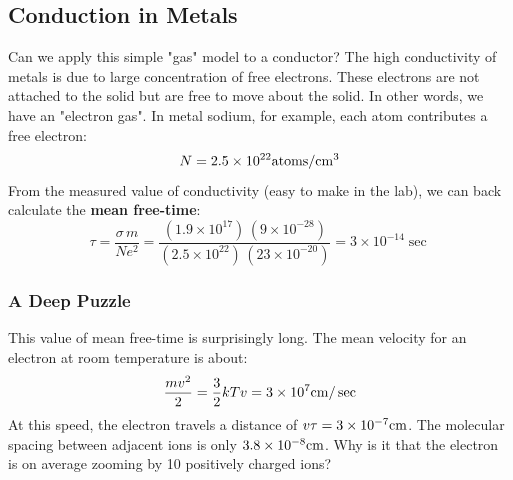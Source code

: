 \subsection{Conduction in Metals}
Can we apply this simple "gas" model to a conductor?  The  high conductivity of metals is due to large concentration of free electrons.   These electrons are not attached to the solid but are free to move about the solid.  In other words, we have an "electron gas".   In metal sodium, for example,  each atom contributes a free electron: 
    \[
        N = 2.5 \times {10^{22}}{\rm{atoms/c}}{{\rm{m}}^{\rm{3}}}
    \]
From the measured value of conductivity (easy to make in the lab), we can back calculate the \textbf{mean free-time}:
    \begin{equation}
        \tau  = \frac{{\sigma \,m}}{{N{e^2}}} = \frac{{\left( {1.9 \times {{10}^{17}}} \right)\,\left( {9 \times {{10}^{ - 28}}} \right)}}{{\left( {2.5 \times {{10}^{22}}} \right)\,\left( {23 \times {{10}^{ - 20}}} \right)}} = 3 \times {10^{ - 14}}\sec
    \end{equation}
\subsubsection{A Deep Puzzle}
This value of mean free-time is surprisingly long.  The mean velocity for an electron at room temperature is about: 
    \begin{equation}
        \frac{{m{v^2}}}{2} = \frac{3}{2}kT  v = 3 \times {10^7}{\rm{cm}}/\sec
    \end{equation}
At this speed, the electron travels a distance of $v\tau  = 3 \times {10^{ - 7}}{\rm{cm}}$.  The molecular spacing between adjacent ions is only $3.8 \times {10^{ - 8}}{\rm{cm}}$.  Why is it that the electron is on average zooming by 10 positively charged ions?
